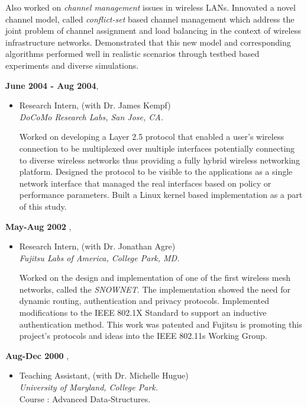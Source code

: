 \begin{resume}
\begin{itemize}
                 Also worked on {\em channel management} issues in wireless LANs. Innovated a novel channel
                 model, called {\em conflict-set} based channel management which address the joint problem of channel assignment and
                 load balancing in the context of wireless infrastructure networks. Demonstrated that this new model
		 and corresponding algorithms performed well in realistic scenarios
                 through testbed based experiments and diverse simulations.

    \end{itemize}

 {\bf June 2004 - Aug 2004},   	
    \begin{itemize}
         \item[] Research Intern, (with Dr. James Kempf)\\
		 {\em DoCoMo Research Labs, San Jose, CA.}

		 Worked on developing a Layer 2.5 protocol that enabled a user's wireless connection to be
                 multiplexed over multiple interfaces potentially connecting to diverse wireless networks thus providing a fully 
                 hybrid wireless networking platform. Designed the protocol to be visible to the applications as a single
                 network interface that managed the real interfaces based on policy or performance parameters. Built a Linux kernel based
                 implementation as a part of this study.
    \end{itemize}

 {\bf May-Aug 2002 },   	
    \begin{itemize}
         \item[] Research Intern, (with Dr. Jonathan Agre)\\
		{\em Fujitsu Labs of America, College Park, MD.}
			
		Worked on the design and implementation of one of the first wireless mesh networks, called the {\em SNOWNET}.
	        The implementation showed the need for dynamic routing, authentication and privacy protocols. Implemented modifications to the IEEE 802.1X Standard
                to support an inductive authentication method. This work was patented and Fujitsu is promoting this project's
                protocols and ideas into the IEEE 802.11s Working Group.
		
    \end{itemize}

 {\bf Aug-Dec 2000 },   	
    \begin{itemize}
         \item[] Teaching Assistant, (with Dr. Michelle Hugue)\\
		{\em University of Maryland, College Park.}\\
		Course : Advanced Data-Structures. 
    \end{itemize}


\end{resume}
